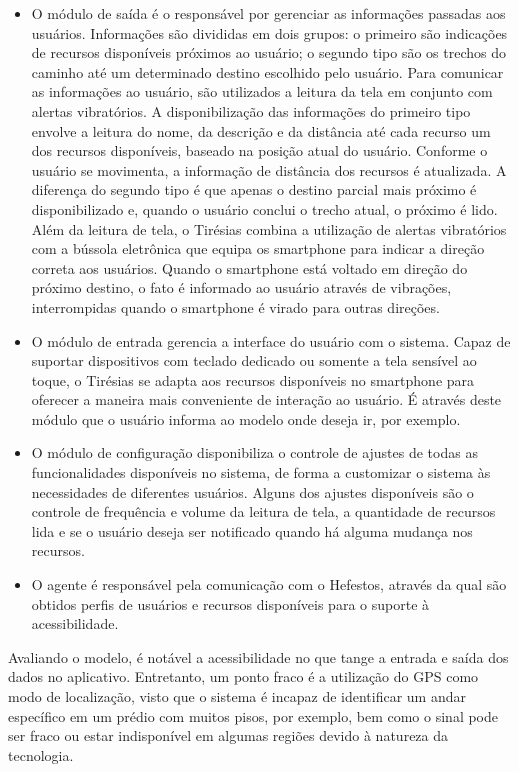 \documentclass[english,brazilian]{UNISINOSmonografia}
\begin{document}
\begin{itemize}
	\item O módulo de saída é o responsável por gerenciar as informações passadas aos usuários. Informações são divididas em dois grupos: o primeiro são indicações de recursos disponíveis próximos ao usuário; o segundo tipo são os trechos do caminho até um determinado destino escolhido pelo usuário. Para comunicar as informações ao usuário, são utilizados a leitura da tela em conjunto com alertas vibratórios. A disponibilização das informações do primeiro tipo envolve a leitura do nome, da descrição e da distância até cada recurso um dos recursos disponíveis, baseado na posição atual do usuário. Conforme o usuário se movimenta, a informação de distância dos recursos é atualizada. A diferença do segundo tipo é que apenas o destino parcial mais próximo é disponibilizado e, quando o usuário conclui o trecho atual, o próximo é lido. Além da leitura de tela, o Tirésias combina a utilização de alertas vibratórios com a bússola eletrônica que equipa os smartphone para indicar a direção correta aos usuários. Quando o smartphone está voltado em direção do próximo destino, o fato é informado ao usuário através de vibrações, interrompidas quando o smartphone é virado para outras direções.

	\item O módulo de entrada gerencia a interface do usuário com o sistema. Capaz de suportar dispositivos com teclado dedicado ou somente a tela sensível ao toque, o Tirésias se adapta aos recursos disponíveis no smartphone para oferecer a maneira mais conveniente de interação ao usuário. É através deste módulo que o usuário informa ao modelo onde deseja ir, por exemplo.

	\item O módulo de configuração disponibiliza o controle de ajustes de todas as funcionalidades disponíveis no sistema, de forma a customizar o sistema às necessidades de diferentes usuários. Alguns dos ajustes disponíveis são o controle de frequência e volume da leitura de tela, a quantidade de recursos lida e se o usuário deseja ser notificado quando há alguma mudança nos recursos.

	\item O agente é responsável pela comunicação com o Hefestos, através da qual são obtidos perfis de usuários e recursos disponíveis para o suporte à acessibilidade.
\end{itemize} 

Avaliando o modelo, é notável a acessibilidade no que tange a entrada e saída dos dados no aplicativo. Entretanto, um ponto fraco é a utilização do GPS como modo de localização, visto que o sistema é incapaz de identificar um andar específico em um prédio com muitos pisos, por exemplo, bem como o sinal pode ser fraco ou estar indisponível em algumas regiões devido à natureza da tecnologia. 
\end{document}
